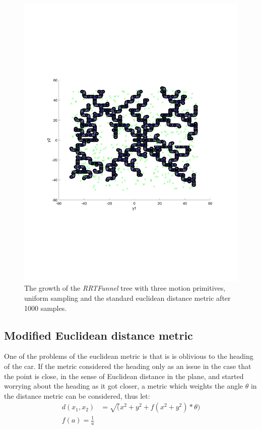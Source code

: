 \begin{figure}
  \includegraphics[scale=.5]{figures/rrtfunnel/rrtfunnel-500samples}
  \caption{The growth of the \textit{RRTFunnel} tree with three motion
    primitives, uniform sampling and the standard euclidean distance metric
    after 1000 samples.}
\end{figure}

\subsection{Modified Euclidean distance metric}

One of the problems of the euclidean metric is that is is oblivious to the
heading of the car. If the metric considered the heading only as an issue in the
case that the point is close, in the sense of Euclidean distance in the plane,
and started worrying about the heading as it got closer, a metric which weights
the angle \(\theta\) in the distance metric can be considered, thus let:
\begin{align}
  d(x_1,x_2) &= \sqrt(x^2 + y^2 + f(x^2 + y^2)*\theta) \\
  f(a) = \frac{1}{a}
\end{align}

